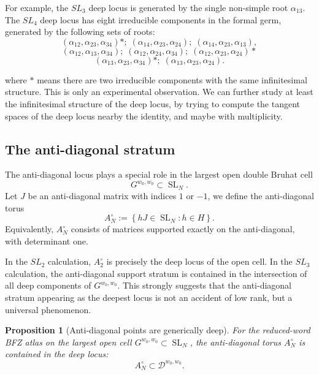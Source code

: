 \documentclass[12pt]{amsart}
\newcommand{\SL}{\operatorname{SL}}
\theoremstyle{plain}
\newtheorem{proposition}[theorem]{Proposition}
\theoremstyle{definition}
\theoremstyle{remark}
\begin{document}
For example, the \(SL_3\) deep locus is generated by the single non-simple root \(\alpha_{13}\).  The \(SL_4\) deep locus has eight irreducible components in the formal germ, generated by the following sets of roots:
\[(\alpha_{12}, \alpha_{23}, \alpha_{34})*;\;(\alpha_{14}, \alpha_{23}, \alpha_{24});\; (\alpha_{14}, \alpha_{23}, \alpha_{13}),\]
\[(\alpha_{12}, \alpha_{13}, \alpha_{34});\;(\alpha_{12}, \alpha_{24}, \alpha_{34});\;(\alpha_{12}, \alpha_{23}, \alpha_{24})*\]
\[(\alpha_{13}, \alpha_{23}, \alpha_{34})*;\;(\alpha_{13}, \alpha_{23}, \alpha_{24}).\]

where $*$ means there are two irreducible components with the same infinitesimal structure. This is only an experimental observation. We can further study at least the infinitesimal structure of the deep locus, by trying to compute the tangent spaces of the deep locus nearby the identity, and maybe with multiplicity.

\subsection{The anti-diagonal stratum}

The anti-diagonal locus plays a special role in the largest open double Bruhat cell
\[
   G^{w_0,w_0}\subset \SL_N.
\]
Let \(J\) be an anti-diagonal matrix with indices $1$ or $-1$, we define the anti-diagonal torus
\[
   A_N^\circ
   :=
   \left\{
   hJ\in \SL_N:
   h\in H
   \right\}.
\]
Equivalently, \(A_N^\circ\) consists of matrices supported exactly on the anti-diagonal, with determinant one.

In the \(SL_2\) calculation, \(A_2^\circ\) is precisely the deep locus of the open cell.  In the \(SL_3\) calculation, the anti-diagonal support stratum is contained in the intersection of all deep components of \(G^{w_0,w_0}\).  This strongly suggests that the anti-diagonal stratum appearing as the deepest locus is not an accident of low rank, but a universal phenomenon.

\begin{proposition}[Anti-diagonal points are generically deep]
\label{prop:anti-diagonal-deep}
For the reduced-word BFZ atlas on the largest open cell \(G^{w_0,w_0}\subset \SL_N\), the anti-diagonal torus \(A_N^\circ\) is contained in the deep locus:
\[
   A_N^\circ\subset \mathcal D^{w_0,w_0}.
\]
\end{proposition}
\end{document}
